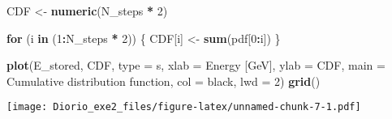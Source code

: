 \documentclass[
]{article}
\newenvironment{Shaded}{\begin{snugshade}}{\end{snugshade}}
\newcommand{\AttributeTok}[1]{\textcolor[rgb]{0.13,0.29,0.53}{#1}}
\newcommand{\ConstantTok}[1]{\textcolor[rgb]{0.56,0.35,0.01}{#1}}
\newcommand{\ControlFlowTok}[1]{\textcolor[rgb]{0.13,0.29,0.53}{\textbf{#1}}}
\newcommand{\DecValTok}[1]{\textcolor[rgb]{0.00,0.00,0.81}{#1}}
\newcommand{\DocumentationTok}[1]{\textcolor[rgb]{0.56,0.35,0.01}{\textbf{\textit{#1}}}}
\newcommand{\FloatTok}[1]{\textcolor[rgb]{0.00,0.00,0.81}{#1}}
\newcommand{\FunctionTok}[1]{\textcolor[rgb]{0.13,0.29,0.53}{\textbf{#1}}}
\newcommand{\NormalTok}[1]{#1}
\newcommand{\OtherTok}[1]{\textcolor[rgb]{0.56,0.35,0.01}{#1}}
\newcommand{\SpecialCharTok}[1]{\textcolor[rgb]{0.81,0.36,0.00}{\textbf{#1}}}
\newcommand{\StringTok}[1]{\textcolor[rgb]{0.31,0.60,0.02}{#1}}
\begin{document}
\begin{Shaded}
\begin{Highlighting}[]
\NormalTok{CDF }\OtherTok{\textless{}{-}} \FunctionTok{numeric}\NormalTok{(N\_steps }\SpecialCharTok{*} \DecValTok{2}\NormalTok{)}

\ControlFlowTok{for}\NormalTok{ (i }\ControlFlowTok{in}\NormalTok{ (}\DecValTok{1}\SpecialCharTok{:}\NormalTok{N\_steps }\SpecialCharTok{*} \DecValTok{2}\NormalTok{)) \{}
\NormalTok{  CDF[i] }\OtherTok{\textless{}{-}} \FunctionTok{sum}\NormalTok{(pdf[}\DecValTok{0}\SpecialCharTok{:}\NormalTok{i])}
\NormalTok{\}}

\FunctionTok{plot}\NormalTok{(E\_stored, CDF, }\AttributeTok{type =} \StringTok{\textquotesingle{}s\textquotesingle{}}\NormalTok{, }
     \AttributeTok{xlab =} \StringTok{\textquotesingle{}Energy [GeV]\textquotesingle{}}\NormalTok{, }\AttributeTok{ylab =} \StringTok{\textquotesingle{}CDF\textquotesingle{}}\NormalTok{, }
     \AttributeTok{main =} \StringTok{\textquotesingle{}Cumulative distribution function\textquotesingle{}}\NormalTok{,}
     \AttributeTok{col =} \StringTok{\textquotesingle{}black\textquotesingle{}}\NormalTok{, }\AttributeTok{lwd =} \DecValTok{2}\NormalTok{)}
\FunctionTok{grid}\NormalTok{()}
\end{Highlighting}
\end{Shaded}

\texttt{[image: Diorio\_exe2\_files/figure-latex/unnamed-chunk-7-1.pdf]}

\begin{Shaded}
\end{Shaded}
\end{document}
